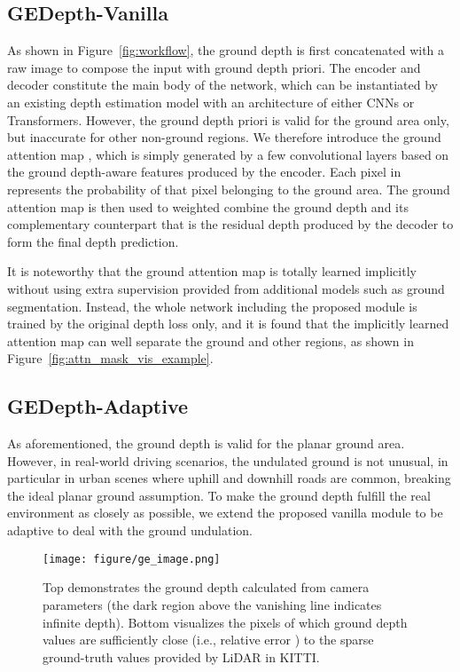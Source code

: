 \documentclass[10pt,twocolumn,letterpaper]{article}
\begin{document}
\subsection{GEDepth-Vanilla}
\label{section:vanilla_pe}
As shown in Figure~\ref{fig:workflow}, the ground depth is first concatenated with a raw image to compose the input with ground depth priori. The encoder and decoder constitute the main body of the network, which can be instantiated by an existing depth estimation model with an architecture of either CNNs or Transformers. However, the ground depth priori is valid for the ground area only, but inaccurate for other non-ground regions. We therefore introduce the ground attention map , which is simply generated by a few convolutional layers based on the ground depth-aware features produced by the encoder. Each pixel in  represents the probability of that pixel belonging to the ground area. The ground attention map is then used to weighted combine the ground depth and its complementary counterpart that is the residual depth produced by the decoder to form the final depth prediction. 

It is noteworthy that the ground attention map is totally learned implicitly without using extra supervision provided from additional models such as ground segmentation. Instead, the whole network including the proposed module is trained by the original depth loss only, and it is found that the implicitly learned attention map can well separate the ground and other regions, as shown in Figure~\ref{fig:attn_mask_vis_example}.      

\subsection{GEDepth-Adaptive}
\label{section:dynamic_pe}
As aforementioned, the ground depth is valid for the planar ground area. However, in real-world driving scenarios, the undulated ground is not unusual, in particular in urban scenes where uphill and downhill roads are common, breaking the ideal planar ground assumption. To make the ground depth fulfill the real environment as closely as possible, we extend the proposed vanilla module to be adaptive to deal with the ground undulation. 

\begin{figure}[t]
\begin{center}
\texttt{[image: figure/ge\_image.png]}
\end{center}
   \caption{Top demonstrates the ground depth calculated from camera parameters (the dark region above the vanishing line indicates infinite depth). Bottom visualizes the pixels of which ground depth values are sufficiently close (i.e., relative error ) to the sparse ground-truth values provided by LiDAR in KITTI. 
   }
\label{fig:pe_example}
\end{figure}
\end{document}
